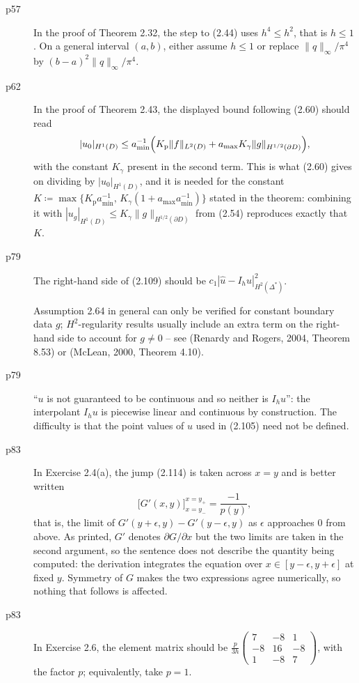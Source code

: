 \documentclass[final]{article}
\theoremstyle{definition}
\begin{document}
\begin{enumerate}
\begin{description}
   \item[p57] In the proof of Theorem 2.32, the step to (2.44) uses $h^4\le h^2$,
that is $h\le1$. On a general interval $(a,b)$, either assume $h\le1$ or
replace $\|q\|_\infty/\pi^4$ by $(b-a)^2\|q\|_\infty/\pi^4$.
   \item[p62] In the proof of Theorem 2.43, the displayed bound following (2.60)
should read
\[
|u_{0}|_{H^{1}(D)} \le a_{\min}^{-1}\Bigl(K_{\mathrm p}\|f\|_{L^{2}(D)}
+ a_{\max}K_{\gamma}\|g\|_{H^{1/2}(\partial D)}\Bigr),
\]
with the constant $K_{\gamma}$ present in the second term. This is what (2.60)
gives on dividing by $|u_{0}|_{H^{1}(D)}$, and it is needed for the constant
$K\coloneq\max\{K_{\mathrm p}a_{\min}^{-1},\,K_{\gamma}(1+a_{\max}a_{\min}^{-1})\}$
stated in the theorem: combining it with $|u_{g}|_{H^{1}(D)}\le K_{\gamma}\|g\|_{H^{1/2}(\partial D)}$
from (2.54) reproduces exactly that $K$.

   \item[p79] The right-hand side of (2.109) should be $c_1|\hat u - I_h\hat u|^2_{H^2(\Delta^*)}$.

   Assumption 2.64 in general can only be verified for constant boundary data $g$; $H^2$-regularity results
usually include an extra term on the right-hand side to account for $g\ne 0$ -- see (Renardy and Rogers,
2004, Theorem 8.53) or (McLean, 2000, Theorem 4.10).

   \item[p79] ``$u$ is not guaranteed to be continuous and so neither is
$I_hu$'': the interpolant $I_hu$ is piecewise linear and continuous by
construction. The difficulty is that the point values of $u$ used in (2.105)
need not be defined.

   \item[p83] In Exercise 2.4(a), the jump (2.114) is taken across $x=y$ and is
better written
\[
\bigl[G'(x,y)\bigr]_{x=y_-}^{x=y_+}=\frac{-1}{p(y)},
\]
that is, the limit of $G'(y+\epsilon,y)-G'(y-\epsilon,y)$ as $\epsilon$
approaches $0$ from above. As printed, $G'$ denotes $\partial G/\partial x$ but
the two limits are taken in the second argument, so the sentence does not
describe the quantity being computed: the derivation integrates the equation
over $x\in[y-\epsilon,y+\epsilon]$ at fixed $y$. Symmetry of $G$ makes the two
expressions agree numerically, so nothing that follows is affected.
   \item[p83] In Exercise 2.6, the element matrix should be
$\frac{p}{3h}\begin{pmatrix}7&-8&1\\-8&16&-8\\1&-8&7\end{pmatrix}$, with the
factor $p$; equivalently, take $p=1$.


\end{description}
\end{enumerate}
\end{document}

